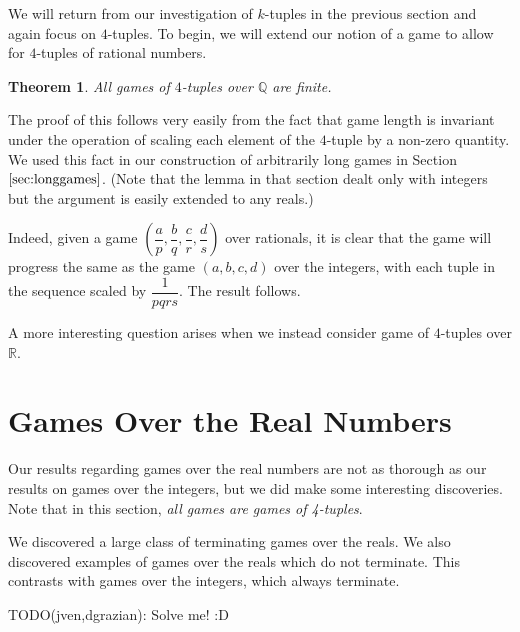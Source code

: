 \documentclass[12pt]{amsart}
\newtheorem{theorem}{Theorem}[section]
\begin{document}
We will return from our investigation of $k$-tuples in the previous section and again focus on $4$-tuples. To begin, we will extend our notion of a game to allow for $4$-tuples of rational numbers.

\begin{theorem}
All games of $4$-tuples over $\mathbb{Q}$ are finite.
\end{theorem}

The proof of this follows very easily from the fact that game length is invariant under the operation of scaling each element of the $4$-tuple by a non-zero quantity. We used this fact in our construction of arbitrarily long games in Section $\ref{sec:longgames}$. (Note that the lemma in that section dealt only with integers but the argument is easily extended to any reals.)

Indeed, given a game $\left(\dfrac{a}{p}, \dfrac{b}{q}, \dfrac{c}{r}, \dfrac{d}{s}\right)$ over rationals, it is clear that the game will progress the same as the game $(a, b, c, d)$ over the integers, with each tuple in the sequence scaled by $\dfrac{1}{pqrs}$. The result follows.

A more interesting question arises when we instead consider game of $4$-tuples over $\mathbb{R}$.

\section{Games Over the Real Numbers}

Our results regarding games over the real numbers are not as thorough as our results on games over the integers, but we did make some interesting discoveries. Note that in this section, \emph{all games are games of 4-tuples}.

We discovered a large class of terminating games over the reals. We also discovered examples of games over the reals which do not terminate. This contrasts with games over the integers, which always terminate.



TODO(jven,dgrazian): Solve me! :D
\end{document}

